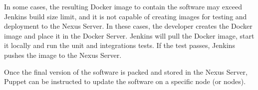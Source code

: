 In some cases, the resulting Docker image to contain the software may exceed Jenkins build size limit, and it is not 
capable of creating images for testing and deployment to the Nexus Server. In these cases, the developer creates the 
Docker image and place it in the Docker Server. Jenkins will pull the Docker image, start it locally and run the unit and 
integrations tests. If the test passes, Jenkins pushes the image to the Nexus Server.

Once the final version of the software is packed and stored in the Nexus Server, Puppet can be instructed to update the 
software on a specific node (or nodes). 


